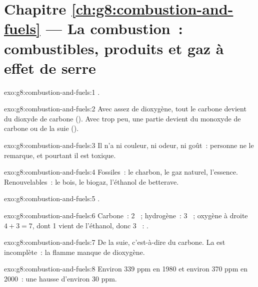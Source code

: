 \section*{Chapitre \ref{ch:g8:combustion-and-fuels} --- La combustion~: combustibles, produits et gaz à effet de serre}

\begin{solution}{exo:g8:combustion-and-fuels:1}
.
\end{solution}

\begin{solution}{exo:g8:combustion-and-fuels:2}
Avec assez de dioxygène, tout le carbone devient du dioxyde de carbone
(). Avec trop peu, une partie devient du monoxyde de
carbone ou de la suie ().
\end{solution}

\begin{solution}{exo:g8:combustion-and-fuels:3}
Il n'a ni couleur, ni odeur, ni goût~: personne ne le remarque, et
pourtant il est toxique.
\end{solution}

\begin{solution}{exo:g8:combustion-and-fuels:4}
Fossiles~: le charbon, le gaz naturel, l'essence. Renouvelables~: le
bois, le biogaz, l'éthanol de betterave.
\end{solution}

\begin{solution}{exo:g8:combustion-and-fuels:5}
.
\end{solution}

\begin{solution}{exo:g8:combustion-and-fuels:6}
Carbone~: 2 ~; hydrogène~: 3 ~; oxygène à droite $4 + 3 =
7$, dont 1 vient de l'éthanol, donc 3 ~:
.
\end{solution}

\begin{solution}{exo:g8:combustion-and-fuels:7}
De la suie, c'est-à-dire du carbone. La  est incomplète~: la
flamme manque de dioxygène.
\end{solution}

\begin{solution}{exo:g8:combustion-and-fuels:8}
Environ 339 ppm en 1980 et environ 370 ppm en 2000~: une hausse
d'environ 30 ppm.
\end{solution}


